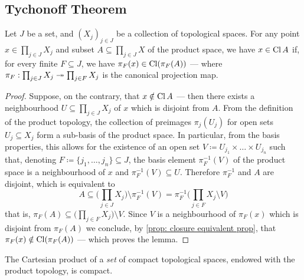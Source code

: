 \subsection{Tychonoff Theorem}

\begin{lemma}
\label{lem:tychonoff-theorem-pre-lemma}
Let \(J\) be a set, and \((X_{j})_{j \in J}\) be a collection of topological
spaces. For any point \(x \in \prod_{j \in J} X_j\) and subset
\(A \subseteq \prod_{j \in J} X\) of the product space, we have \(x \in \operatorname{Cl} A\)
if, for every finite \(F \subseteq J\), we have \(\pi_F(x) \in \operatorname{Cl}(\pi_F(A))\)
--- where \(\pi_F: \prod_{j \in J} X_j \twoheadrightarrow \prod_{j \in F} X_j\) is the
canonical projection map.
\end{lemma}

\begin{proof}
Suppose, on the contrary, that \(x \notin \operatorname{Cl} A\) --- then there exists a
neighbourhood \(U \subseteq \prod_{j \in J} X_j\) of \(x\) which is disjoint
from \(A\). From the definition of the product topology, the collection of
preimages \(\pi_j(U_j)\) for open sets \(U_j \subseteq X_j\) form a sub-basis of
the product space. In particular, from the basis properties, this allows for the
existence of an open set \(V \coloneq U_{j_1} \times \dots \times U_{j_n}\) such
that, denoting \(F \coloneq \{j_1, \dots, j_n\} \subseteq J\), the basis element
\(\pi^{-1}_F(V)\) of the product space is a neighbourhood of \(x\) and
\(\pi_F^{-1}(V) \subseteq U\). Therefore \(\pi_F^{-1}\) and \(A\) are disjoint,
which is equivalent to
\[A \subseteq \bigg( \prod_{j \in J} X_j \bigg) \setminus \pi_F^{-1}(V) =
\pi_F^{-1}\bigg( \prod_{j \in F} X_j \setminus V \bigg)
\]
that is, \(\pi_F(A) \subseteq \big( \prod_{j \in F} X_j \big) \setminus
V\). Since \(V\) is a neighbourhood of \(\pi_F(x)\) which is disjoint from
\(\pi_F(A)\) we conclude, by \cref{prop: closure equivalent prop}, that
\(\pi_F(x) \notin \operatorname{Cl}(\pi_F(A))\) --- which proves the lemma.
\end{proof}

\begin{theorem}[Tychonoff]
\label{thm:tychonoff-theorem}
The Cartesian product of a \emph{set} of compact topological spaces, endowed
with the product topology, is compact.
\end{theorem}

